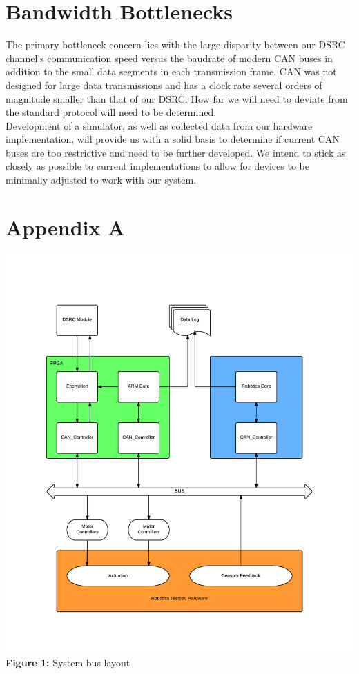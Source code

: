 \documentclass[paper=a4, fontsize=11pt]{scrartcl}
\numberwithin{equation}{section}		%
\numberwithin{figure}{section}			%
\numberwithin{table}{section}				%
\begin{document}
\section{Bandwidth Bottlenecks}
The primary bottleneck concern lies with the large disparity between our DSRC channel's communication speed versus the baudrate of modern CAN buses in addition to the small data segments in each transmission frame. CAN was not designed for large data transmissions and has a clock rate several orders of magnitude smaller than that of our DSRC. How far we will need to deviate from the standard protocol will need to be determined.\\

\noindent Development of a simulator, as well as collected data from our hardware implementation, will provide us with a solid basis to determine if current CAN buses are too restrictive and need to be further developed. We intend to stick as closely as possible to current implementations to allow for devices to be minimally adjusted to work with our system.

\newpage
\section*{Appendix A}
\begin{center}
	\includegraphics[width = \textwidth]{images/Bus_Layout}
	\textbf{Figure 1: }System bus layout
\end{center}

\end{document}
